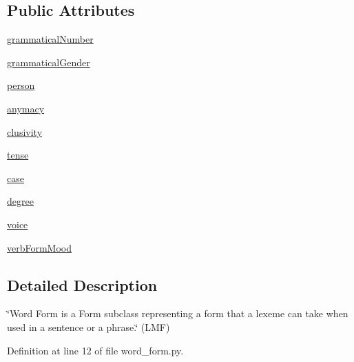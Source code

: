 \subsection*{Public Attributes}
\begin{DoxyCompactItemize}
\item 
\hyperlink{classlmf_1_1src_1_1morphology_1_1word__form_1_1_word_form_afa022505f197952b8cf9229e065089c2}{grammatical\+Number}
\item 
\hyperlink{classlmf_1_1src_1_1morphology_1_1word__form_1_1_word_form_ab6f9abda4baef6ac9e61ef377c532279}{grammatical\+Gender}
\item 
\hyperlink{classlmf_1_1src_1_1morphology_1_1word__form_1_1_word_form_a982fc33af45a08aa5a039dc4701c3689}{person}
\item 
\hyperlink{classlmf_1_1src_1_1morphology_1_1word__form_1_1_word_form_aaf6096a08af3e92ad3878b68d2e136d3}{anymacy}
\item 
\hyperlink{classlmf_1_1src_1_1morphology_1_1word__form_1_1_word_form_aafbd3d5422083422a4a9ee9b1379913e}{clusivity}
\item 
\hyperlink{classlmf_1_1src_1_1morphology_1_1word__form_1_1_word_form_aaf6dd6658e2e9014ea0490d0edb6cec8}{tense}
\item 
\hyperlink{classlmf_1_1src_1_1morphology_1_1word__form_1_1_word_form_ac996cb6a252a2e97aea0ba861982a640}{case}
\item 
\hyperlink{classlmf_1_1src_1_1morphology_1_1word__form_1_1_word_form_ae529bc2d6ef927ccb6da6599901dccb2}{degree}
\item 
\hyperlink{classlmf_1_1src_1_1morphology_1_1word__form_1_1_word_form_ac08b72f6837815d9d11d3cb0a36ed932}{voice}
\item 
\hyperlink{classlmf_1_1src_1_1morphology_1_1word__form_1_1_word_form_a47aea97a4bbd8cca9624b0143f639716}{verb\+Form\+Mood}
\end{DoxyCompactItemize}


\subsection{Detailed Description}
\char`\"{}\+Word Form is a Form subclass representing a form that a lexeme can take when used in a sentence or a phrase.\char`\"{} (L\+M\+F) 

Definition at line 12 of file word\+\_\+form.\+py.



